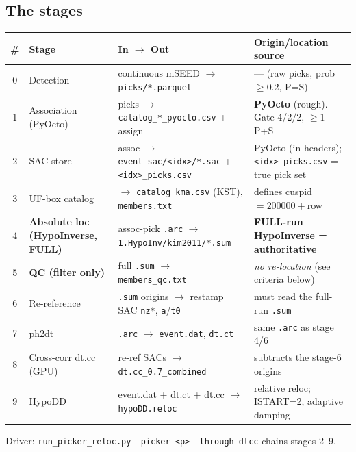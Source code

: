 \documentclass[11pt]{article}
\begin{document}
\subsection{The stages}

\begin{center}
\small
\begin{tabular}{@{}c>{\raggedright\arraybackslash}p{2.7cm}>{\raggedright\arraybackslash}p{5.3cm}>{\raggedright\arraybackslash}p{4.4cm}@{}}
\toprule
\# & Stage & In $\rightarrow$ Out & Origin/location source \\
\midrule
0 & Detection & continuous mSEED $\rightarrow$ \texttt{picks/*.parquet} & --- (raw picks, prob$\ge$0.2, P{=}S) \\
1 & Association (PyOcto) & picks $\rightarrow$ \texttt{catalog\_*\_pyocto.csv} + assign & \textbf{PyOcto} (rough). Gate 4/2/2, $\ge$1 P{+}S \\
2 & SAC store & assoc $\rightarrow$ \texttt{event\_sac/<idx>/*.sac} + \texttt{<idx>\_picks.csv} & PyOcto (in headers); \texttt{<idx>\_picks.csv} = true pick set \\
3 & UF-box catalog & $\rightarrow$ \texttt{catalog\_kma.csv} (KST), \texttt{members.txt} & defines cuspid $=200000+$row \\
4 & \textbf{Absolute loc (HypoInverse, FULL)} & assoc-pick \texttt{.arc} $\rightarrow$ \texttt{1.HypoInv/kim2011/*.sum} & \textbf{FULL-run HypoInverse = authoritative} \\
5 & \textbf{QC (filter only)} & full \texttt{.sum} $\rightarrow$ \texttt{members\_qc.txt} & \emph{no re-location} (see criteria below) \\
6 & Re-reference & \texttt{.sum} origins $\rightarrow$ restamp SAC \texttt{nz*}, \texttt{a}/\texttt{t0} & must read the full-run \texttt{.sum} \\
7 & ph2dt & \texttt{.arc} $\rightarrow$ \texttt{event.dat}, \texttt{dt.ct} & same \texttt{.arc} as stage 4/6 \\
8 & Cross-corr dt.cc (GPU) & re-ref SACs $\rightarrow$ \texttt{dt.cc\_0.7\_combined} & subtracts the stage-6 origins \\
9 & HypoDD & event.dat + dt.ct + dt.cc $\rightarrow$ \texttt{hypoDD.reloc} & relative reloc; ISTART=2, adaptive damping \\
\bottomrule
\end{tabular}
\end{center}

\noindent Driver: \texttt{run\_picker\_reloc.py --picker <p> --through dtcc} chains stages 2--9.
\end{document}
